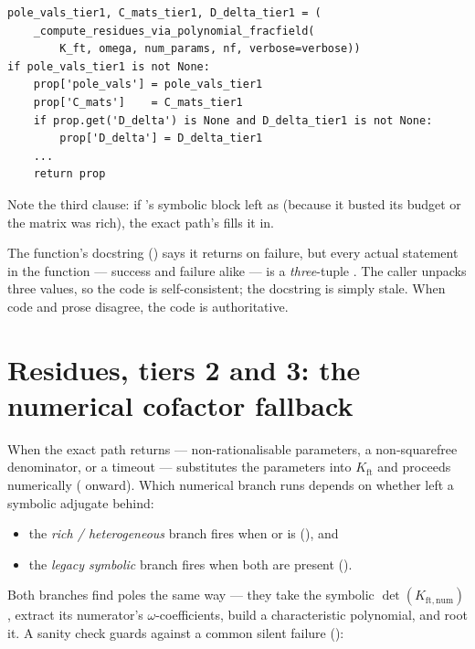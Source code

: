 \begin{lstlisting}
pole_vals_tier1, C_mats_tier1, D_delta_tier1 = (
    _compute_residues_via_polynomial_fracfield(
        K_ft, omega, num_params, nf, verbose=verbose))
if pole_vals_tier1 is not None:
    prop['pole_vals'] = pole_vals_tier1
    prop['C_mats']    = C_mats_tier1
    if prop.get('D_delta') is None and D_delta_tier1 is not None:
        prop['D_delta'] = D_delta_tier1
    ...
    return prop
\end{lstlisting}

Note the third clause: if 's symbolic block left
 as  (because it busted its budget or the matrix was
rich), the exact path's  fills it in.

\begin{note}
The function's docstring () says it returns
 on failure, but every actual  statement in the
function --- success and failure alike --- is a \emph{three}-tuple
. The caller unpacks three values, so the
code is self-consistent; the docstring is simply stale. When code and prose
disagree, the code is authoritative.
\end{note}

\section{Residues, tiers 2 and 3: the numerical cofactor fallback}

When the exact path returns  --- non-rationalisable parameters, a
non-squarefree denominator, or a timeout --- 
substitutes the parameters into $K_{\mathrm{ft}}$ and proceeds numerically
( onward). Which numerical branch runs depends
on whether  left a symbolic adjugate behind:

\begin{itemize}
  \item the \emph{rich / heterogeneous} branch fires when  or
         is  (), and
  \item the \emph{legacy symbolic} branch fires when both are present
        ().
\end{itemize}

Both branches find poles the same way --- they take the symbolic
$\det(K_{\mathrm{ft,num}})$, extract its numerator's $\omega$-coefficients, build a
characteristic polynomial, and root it. A sanity check guards against a common
silent failure ():

